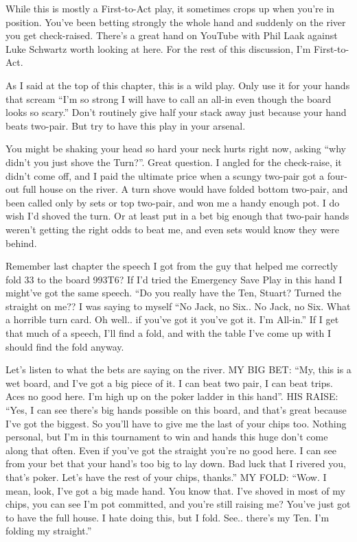While this is mostly a First-to-Act play, it sometimes crops up when
you're in position. You've been betting strongly the whole hand and
suddenly on the river you get check-raised. There's a great hand on
YouTube with Phil Laak against Luke Schwartz worth looking at here.
For the rest of this discussion, I'm First-to-Act.

As I said at the top of this chapter, this is a wild play. Only use it
for your hands that scream ``I'm so strong I will have to call an
all-in even though the board looks so scary.'' Don't routinely give
half your stack away just because your hand beats two-pair. But try to
have this play in your arsenal.

You might be shaking your head so hard your neck hurts right now,
asking ``why didn't you just shove the Turn?''. Great question. I
angled for the check-raise, it didn't come off, and I paid the
ultimate price when a scungy two-pair got a four-out full house on the
river. A turn shove would have folded bottom two-pair, and been called
only by sets or top two-pair, and won me a handy enough pot. I do wish
I'd shoved the turn. Or at least put in a bet big enough that two-pair
hands weren't getting the right odds to beat me, and even sets would
know they were behind.

Remember last chapter the speech I got from the guy that helped me
correctly fold 33 to the board 993T6? If I'd tried the Emergency Save
Play in this hand I might've got the same speech. ``Do you really have
the Ten, Stuart? Turned the straight on me?? I was saying to myself
``No Jack, no Six.. No Jack, no Six. What a horrible turn card. Oh
well.. if you've got it you've got it. I'm All-in.'' If I get that
much of a speech, I'll find a fold, and with the table I've come up
with I should find the fold anyway.

Let's listen to what the bets are saying on the river.
MY BIG BET: ``My, this is a wet board, and I've got a big piece of
it. I can beat two pair, I can beat trips. Aces no good here. I'm high
up on the poker ladder in this hand''.
HIS RAISE: ``Yes, I can see there's big hands possible on this board,
and that's great because I've got the biggest. So you'll have to give
me the last of your chips too. Nothing personal, but I'm in this
tournament to win and hands this huge don't come along that
often. Even if you've got the straight you're no good here. I can see
from your bet that your hand's too big to lay down. Bad luck that I
rivered you, that's poker. Let's have the rest of your chips,
thanks.''
MY FOLD: ``Wow. I mean, look, I've got a big made hand. You know
that. I've shoved in most of my chips, you can see I'm pot committed,
and you're still raising me? You've just got to have the full house. I
hate doing this, but I fold. See.. there's my Ten. I'm folding my
straight.''

